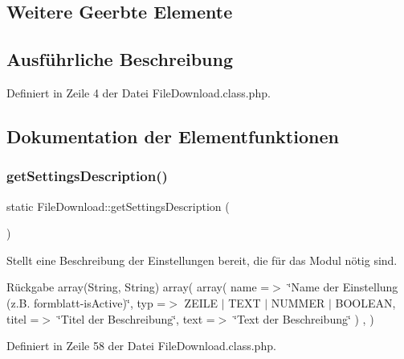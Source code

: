 \subsection*{Weitere Geerbte Elemente}


\subsection{Ausführliche Beschreibung}


Definiert in Zeile 4 der Datei File\+Download.\+class.\+php.



\subsection{Dokumentation der Elementfunktionen}
\mbox{\label{class_file_download_a6083b324054d898cc2b61f5fb03caea4}} 
\subsubsection{\texorpdfstring{get\+Settings\+Description()}{getSettingsDescription()}}
{\footnotesize\ttfamily static File\+Download\+::get\+Settings\+Description (\begin{DoxyParamCaption}{ }\end{DoxyParamCaption})\hspace{0.3cm}{\ttfamily [static]}}

Stellt eine Beschreibung der Einstellungen bereit, die für das Modul nötig sind. \begin{DoxyReturn}{Rückgabe}
array(\+String, String) array( array( \textquotesingle{}name\textquotesingle{} =$>$ \char`\"{}\+Name der Einstellung (z.\+B. formblatt-\/is\+Active)\char`\"{}, \textquotesingle{}typ\textquotesingle{} =$>$ Z\+E\+I\+LE $\vert$ T\+E\+XT $\vert$ N\+U\+M\+M\+ER $\vert$ B\+O\+O\+L\+E\+AN, \textquotesingle{}titel\textquotesingle{} =$>$ \char`\"{}\+Titel der Beschreibung\char`\"{}, \textquotesingle{}text\textquotesingle{} =$>$ \char`\"{}\+Text der Beschreibung\char`\"{} ) , ) 
\end{DoxyReturn}


Definiert in Zeile 58 der Datei File\+Download.\+class.\+php.

\mbox{\label{class_file_download_a7e2b4eaaff2303c3dd5d24f719ad2eb2}} 
